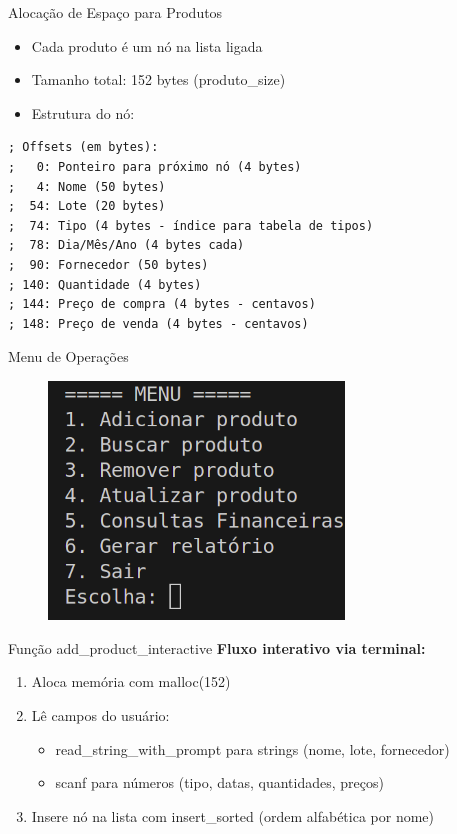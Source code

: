 \documentclass{beamer}
\begin{document}
\begin{frame}[fragile]{Alocação de Espaço para Produtos}
    \begin{itemize}
        \item Cada produto é um nó na lista ligada
        \item Tamanho total: 152 bytes (produto\_size)
        \item Estrutura do nó:
    \end{itemize}
    \begin{verbatim}
; Offsets (em bytes):
;   0: Ponteiro para próximo nó (4 bytes)
;   4: Nome (50 bytes)
;  54: Lote (20 bytes)
;  74: Tipo (4 bytes - índice para tabela de tipos)
;  78: Dia/Mês/Ano (4 bytes cada)
;  90: Fornecedor (50 bytes)
; 140: Quantidade (4 bytes)
; 144: Preço de compra (4 bytes - centavos)
; 148: Preço de venda (4 bytes - centavos)
    \end{verbatim}
\end{frame}

\begin{frame}{Menu de Operações}
    \begin{figure}
        \centering
        \includegraphics[width=0.7\textwidth]{img/menu-inicial.png}
    \end{figure}
\end{frame}

\begin{frame}{Função add\_product\_interactive}
    \textbf{Fluxo interativo via terminal:}
    \begin{enumerate}
        \item Aloca memória com malloc(152)
        \item Lê campos do usuário:
        \begin{itemize}
            \item read\_string\_with\_prompt para strings (nome, lote, fornecedor)
            \item scanf para números (tipo, datas, quantidades, preços)
        \end{itemize}
        \item Insere nó na lista com insert\_sorted (ordem alfabética por nome)
    \end{enumerate}
\end{frame}
\end{document}
